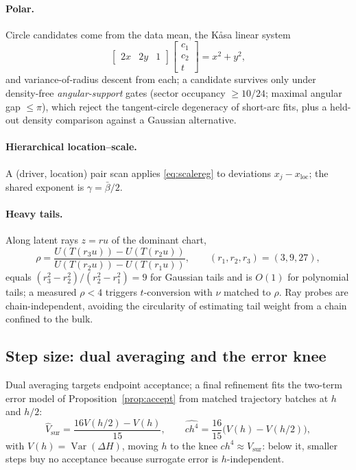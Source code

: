 \documentclass[11pt]{article}
\theoremstyle{remark}
\begin{document}
\paragraph{Polar.} Circle candidates come from the data mean, the
K\r{a}sa linear system \citep{kasa1976}
\begin{equation}
\begin{bmatrix}2x&2y&1\end{bmatrix}
\begin{bmatrix}c_1\\ c_2\\ t\end{bmatrix}=x^2+y^2,
\label{eq:kasa}
\end{equation}
and variance-of-radius descent from each; a candidate survives only under
density-free \emph{angular-support} gates (sector occupancy $\ge10/24$;
maximal angular gap $\le\pi$), which reject the tangent-circle
degeneracy of short-arc fits, plus a held-out density comparison against
a Gaussian alternative.
\paragraph{Hierarchical location--scale.} A (driver, location) pair scan
applies \eqref{eq:scalereg} to deviations $x_j-x_{\mathrm{loc}}$; the
shared exponent is $\gamma=\bar\beta/2$.
\paragraph{Heavy tails.} Along latent rays $z=ru$ of the dominant chart,
\begin{equation}
\rho=\frac{U(T(r_3u))-U(T(r_2u))}{U(T(r_2u))-U(T(r_1u))},
\qquad(r_1,r_2,r_3)=(3,9,27),
\label{eq:ray}
\end{equation}
equals $(r_3^2-r_2^2)/(r_2^2-r_1^2)=9$ for Gaussian tails and is $O(1)$
for polynomial tails; a measured $\rho<4$ triggers $t$-conversion with
$\nu$ matched to $\rho$. Ray probes are chain-independent, avoiding the
circularity of estimating tail weight from a chain confined to the bulk.

\subsection{Step size: dual averaging and the error knee}
Dual averaging \citep{hoffman2014} targets endpoint acceptance; a final
refinement fits the two-term error model of
Proposition~\ref{prop:accept} from matched trajectory batches at $h$ and
$h/2$:
\begin{equation}
\widehat V_{\mathrm{sur}}=\frac{16V(h/2)-V(h)}{15},
\qquad
\widehat{ch^4}=\frac{16}{15}\bigl(V(h)-V(h/2)\bigr),
\label{eq:knee}
\end{equation}
with $V(h)=\operatorname{Var}(\Delta H)$, moving $h$ to the knee
$ch^4\approx V_{\mathrm{sur}}$: below it, smaller steps buy no
acceptance because surrogate error is $h$-independent.
\end{document}
